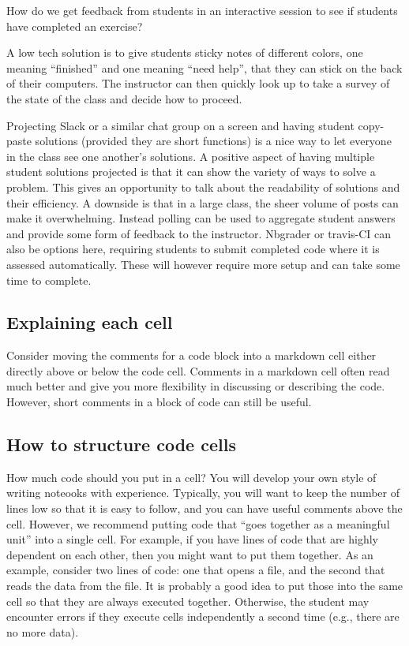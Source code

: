 \documentclass[]{book}
\begin{document}
How do we get feedback from students in an interactive session to see if
students have completed an exercise?

A low tech solution is to give students sticky notes of different
colors, one meaning ``finished'' and one meaning ``need help'', that
they can stick on the back of their computers. The instructor can then
quickly look up to take a survey of the state of the class and decide
how to proceed.

Projecting Slack or a similar chat group on a screen and having student
copy-paste solutions (provided they are short functions) is a nice way
to let everyone in the class see one another's solutions. A positive
aspect of having multiple student solutions projected is that it can
show the variety of ways to solve a problem. This gives an opportunity
to talk about the readability of solutions and their efficiency. A
downside is that in a large class, the sheer volume of posts can make it
overwhelming. Instead polling can be used to aggregate student answers
and provide some form of feedback to the instructor. Nbgrader or
travis-CI can also be options here, requiring students to submit
completed code where it is assessed automatically. These will however
require more setup and can take some time to complete.

\subsection{Explaining each cell}\label{explaining-each-cell}

Consider moving the comments for a code block into a markdown cell
either directly above or below the code cell. Comments in a markdown
cell often read much better and give you more flexibility in discussing
or describing the code. However, short comments in a block of code can
still be useful.

\subsection{How to structure code
cells}\label{how-to-structure-code-cells}

How much code should you put in a cell? You will develop your own style
of writing noteooks with experience. Typically, you will want to keep
the number of lines low so that it is easy to follow, and you can have
useful comments above the cell. However, we recommend putting code that
``goes together as a meaningful unit'' into a single cell. For example,
if you have lines of code that are highly dependent on each other, then
you might want to put them together. As an example, consider two lines
of code: one that opens a file, and the second that reads the data from
the file. It is probably a good idea to put those into the same cell so
that they are always executed together. Otherwise, the student may
encounter errors if they execute cells independently a second time
(e.g., there are no more data).
\end{document}
